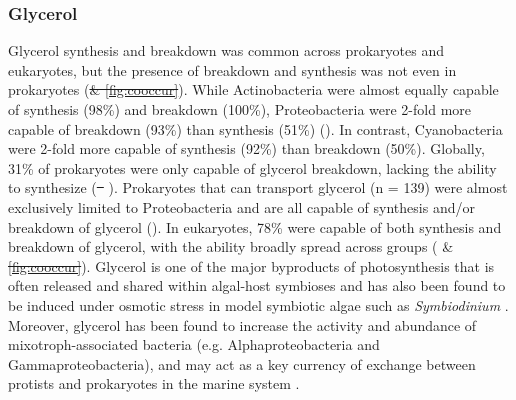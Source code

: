 \documentclass[utf8]{frontiersSCNS} %
\providecommand{\DIFaddtex}[1]{{\protect\color{blue}\uwave{#1}}} %
\providecommand{\DIFdeltex}[1]{{\protect\color{red}\sout{#1}}}                      %
\providecommand{\DIFaddbegin}{} %
\providecommand{\DIFaddend}{} %
\providecommand{\DIFdelbegin}{} %
\providecommand{\DIFdelend}{} %
\providecommand{\DIFadd}[1]{\texorpdfstring{\DIFaddtex{#1}}{#1}} %
\providecommand{\DIFdel}[1]{\texorpdfstring{\DIFdeltex{#1}}{}} %
\begin{document}
\subsubsection*{Glycerol}
Glycerol synthesis and breakdown was common across prokaryotes and eukaryotes, but the presence of breakdown and synthesis was not even in prokaryotes (\DIFdelbegin \DIFdel{\& \ref{fig:cooccur}}\DIFdelend ). While Actinobacteria were almost equally capable of synthesis (98\%) and breakdown (100\%), Proteobacteria were 2-fold more capable of breakdown (93\%) than synthesis (51\%) (). In contrast, Cyanobacteria were 2-fold more capable of synthesis (92\%) than breakdown (50\%). Globally, 31\% of prokaryotes were only capable of glycerol breakdown, lacking the ability to synthesize (\DIFdelbegin \DIFdel{\mbox{%
}%
}\DIFdelend \DIFaddbegin \DIFadd{\mbox{%
}%
}\DIFaddend ). Prokaryotes that can transport glycerol (n = 139) were almost exclusively limited to Proteobacteria and are all capable of synthesis and/or breakdown of glycerol (). In eukaryotes, 78\% were capable of both synthesis and breakdown of glycerol, with the ability broadly spread across groups ( \& \DIFdelbegin \DIFdel{\ref{fig:cooccur}}\DIFdelend \DIFaddbegin \DIFadd{\ref{fig:euk-bac-comp}}\DIFaddend ). Glycerol is one of the major byproducts of photosynthesis that is often released and shared within algal-host symbioses and has also been found to be induced under osmotic stress in model symbiotic algae such as \emph{Symbiodinium} \citep{Suesc_n_Bol_var_2016, Mayfield_2007}. Moreover, glycerol has been found to increase the activity and abundance of mixotroph-associated bacteria (e.g. Alphaproteobacteria and Gammaproteobacteria), and may act as a key currency of exchange between protists and prokaryotes in the marine system \citep{Poddar_2018}.  
\end{document}
